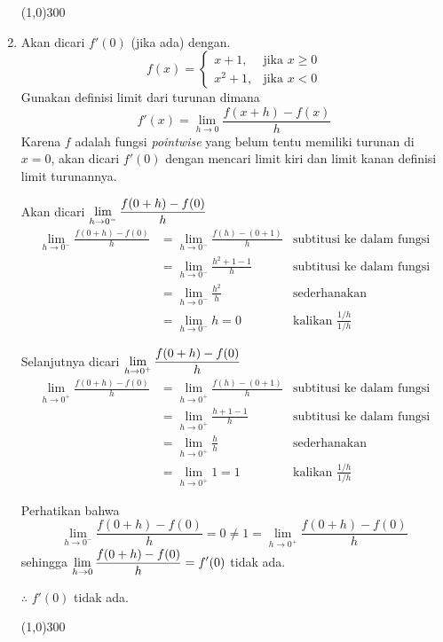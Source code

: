 \begin{enumerate}[leftmargin=*, label={\arabic*}.]
\begin{center}\line(1,0){300}\end{center}


\item Akan dicari $f'(0)$ (jika ada) dengan.
\[
f(x) = 
\begin{cases}
    x+1, &\text{jika $x \geq 0$}\\
    x^{2}+1, &\text{jika $x < 0$}
\end{cases}
\]
Gunakan definisi limit dari turunan dimana
\[
f'(x) = \lim_{h\to 0} \frac{f(x+h)-f(x)}{h}
\]
Karena $f$ adalah fungsi \textit{pointwise} yang belum tentu memiliki turunan 
di $x=0$, akan dicari $f'(0)$ dengan mencari limit kiri dan limit kanan definisi 
limit turunannya.

Akan dicari $\displaystyle \lim_{h\to 0^{-}} \frac{f(0+h)-f(0)}{h}$
\begin{align*}
    \lim_{h\to 0^{-}} \frac{f(0+h)-f(0)}{h}
    &= \lim_{h\to 0^{-}} \frac{f(h)-(0+1)}{h}
    &\text{subtitusi ke dalam fungsi}\\
    &= \lim_{h\to 0^{-}} \frac{h^{2}+1-1}{h}
    &\text{subtitusi ke dalam fungsi}\\
    &= \lim_{h\to 0^{-}} \frac{h^{2}}{h}
    &\text{sederhanakan}\\
    &= \lim_{h\to 0^{-}} h = 0
    &\text{kalikan $\frac{1/h}{1/h}$}
\end{align*}

Selanjutnya dicari $\displaystyle \lim_{h\to 0^{+}} \frac{f(0+h)-f(0)}{h}$
\begin{align*}
    \lim_{h\to 0^{+}} \frac{f(0+h)-f(0)}{h}
    &= \lim_{h\to 0^{+}} \frac{f(h)-(0+1)}{h}
    &\text{subtitusi ke dalam fungsi}\\
    &= \lim_{h\to 0^{+}} \frac{h+1-1}{h}
    &\text{subtitusi ke dalam fungsi}\\
    &= \lim_{h\to 0^{+}} \frac{h}{h}
    &\text{sederhanakan}\\
    &= \lim_{h\to 0^{+}} 1 = 1
    &\text{kalikan $\frac{1/h}{1/h}$}
\end{align*}

Perhatikan bahwa
\[
\lim_{h\to 0^{-}} \frac{f(0+h)-f(0)}{h} = 0 
\neq 1 = \lim_{h\to 0^{+}} \frac{f(0+h)-f(0)}{h}
\]
sehingga $\displaystyle \lim_{h\to 0} \frac{f(0+h)-f(0)}{h} = f'(0)$ tidak ada.

$\therefore$ $f'(0)$ tidak ada.


\begin{center}\line(1,0){300}\end{center}



\end{enumerate}
